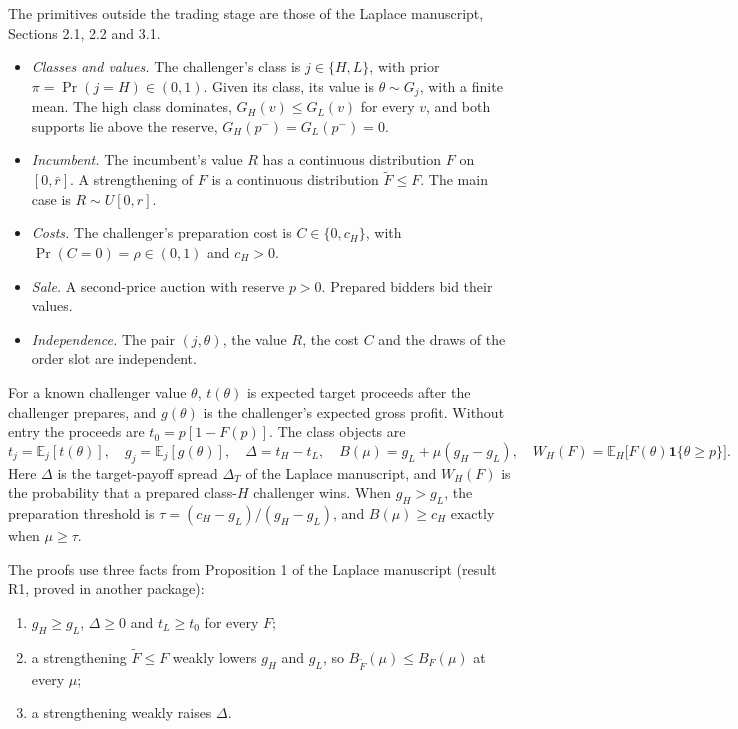 \documentclass[11pt]{article}
\theoremstyle{definition}
\newcommand{\E}{\mathbb E}
\newcommand{\one}{\mathbf 1}
\begin{document}
The primitives outside the trading stage are those of the Laplace manuscript, Sections 2.1, 2.2 and 3.1.
\begin{itemize}
\item \emph{Classes and values.} The challenger's class is $j\in\{H,L\}$, with prior $\pi=\Pr(j=H)\in(0,1)$.
  Given its class, its value is $\theta\sim G_j$, with a finite mean. The high class dominates,
  $G_H(v)\le G_L(v)$ for every $v$, and both supports lie above the reserve, $G_H(p^-)=G_L(p^-)=0$.
\item \emph{Incumbent.} The incumbent's value $R$ has a continuous distribution $F$ on $[0,\bar r]$.
  A strengthening of $F$ is a continuous distribution $\tilde F\le F$. The main case is $R\sim U[0,r]$.
\item \emph{Costs.} The challenger's preparation cost is $C\in\{0,c_H\}$, with $\Pr(C=0)=\rho\in(0,1)$ and $c_H>0$.
\item \emph{Sale.} A second-price auction with reserve $p>0$. Prepared bidders bid their values.
\item \emph{Independence.} The pair $(j,\theta)$, the value $R$, the cost $C$ and the draws of the order slot
  are independent.
\end{itemize}

For a known challenger value $\theta$, $t(\theta)$ is expected target proceeds after the challenger prepares,
and $g(\theta)$ is the challenger's expected gross profit. Without entry the proceeds are $t_0=p[1-F(p)]$.
The class objects are
\[
t_j=\E_j[t(\theta)],\quad g_j=\E_j[g(\theta)],\quad \Delta=t_H-t_L,\quad B(\mu)=g_L+\mu(g_H-g_L),\quad
W_H(F)=\E_H\big[F(\theta)\one\{\theta\ge p\}\big].
\]
Here $\Delta$ is the target-payoff spread $\Delta_T$ of the Laplace manuscript, and $W_H(F)$ is the
probability that a prepared class-$H$ challenger wins. When $g_H>g_L$, the preparation threshold is
$\tau=(c_H-g_L)/(g_H-g_L)$, and $B(\mu)\ge c_H$ exactly when $\mu\ge\tau$.

The proofs use three facts from Proposition 1 of the Laplace manuscript (result R1, proved in another package):
\begin{enumerate}[label=(P\arabic*)]
\item $g_H\ge g_L$, $\Delta\ge 0$ and $t_L\ge t_0$ for every $F$;
\item a strengthening $\tilde F\le F$ weakly lowers $g_H$ and $g_L$, so $B_{\tilde F}(\mu)\le B_F(\mu)$ at every $\mu$;
\item a strengthening weakly raises $\Delta$.
\end{enumerate}
\end{document}
